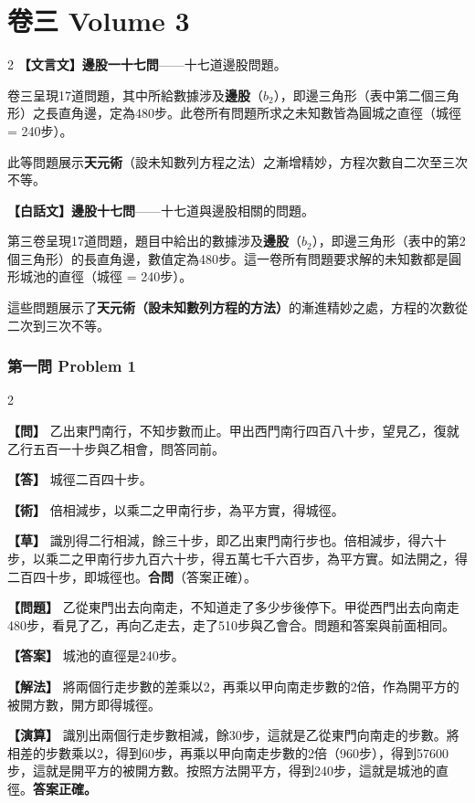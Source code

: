\documentclass[11pt,a4paper]{article}
\newcommand{\wen}[1]{\par\noindent\textbf{\color{problemcolor}【問】} #1\par}
\newcommand{\da}[1]{\par\noindent\textbf{\color{problemcolor}【答】} #1\par}
\newcommand{\shu}[1]{\par\noindent\textbf{\color{problemcolor}【術】} #1\par}
\newcommand{\cao}[1]{\par\noindent\textbf{\color{problemcolor}【草】} #1\par}
\newcommand{\wenm}[1]{\par\noindent\textbf{\color{problemcolor}【問題】} #1\par}
\newcommand{\dam}[1]{\par\noindent\textbf{\color{problemcolor}【答案】} #1\par}
\newcommand{\shum}[1]{\par\noindent\textbf{\color{problemcolor}【解法】} #1\par}
\newcommand{\caom}[1]{\par\noindent\textbf{\color{problemcolor}【演算】} #1\par}
\begin{document}
\newpage

\section{卷三 \quad Volume 3}
\label{sec:vol3}

\begin{paracol}{2}
\textbf{【文言文】}\textbf{邊股一十七問}——十七道邊股問題。

卷三呈現17道問題，其中所給數據涉及\textbf{邊股}（$b_2$），即邊三角形（表中第二個三角形）之長直角邊，定為480步。此卷所有問題所求之未知數皆為圓城之直徑（城徑 = 240步）。

此等問題展示\textbf{天元術}（設未知數列方程之法）之漸增精妙，方程次數自二次至三次不等。

\switchcolumn
\textbf{【白話文】}\textbf{邊股十七問}——十七道與邊股相關的問題。

第三卷呈現17道問題，題目中給出的數據涉及\textbf{邊股}（$b_2$），即邊三角形（表中的第2個三角形）的長直角邊，數值定為480步。這一卷所有問題要求解的未知數都是圓形城池的直徑（城徑 = 240步）。

這些問題展示了\textbf{天元術（設未知數列方程的方法）}的漸進精妙之處，方程的次數從二次到三次不等。
\end{paracol}

\vspace{0.5cm}

\subsubsection*{第一問 \quad Problem 1}

\begin{paracol}{2}
\wen{乙出東門南行，不知步數而止。甲出西門南行四百八十步，望見乙，復就乙行五百一十步與乙相會，問答同前。}

\da{城徑二百四十步。}

\shu{倍相減步，以乘二之甲南行步，為平方實，得城徑。}

\cao{識別得二行相減，餘三十步，即乙出東門南行步也。倍相減步，得六十步，以乘二之甲南行步九百六十步，得五萬七千六百步，為平方實。如法開之，得二百四十步，即城徑也。\textbf{合問}（答案正確）。}

\switchcolumn
\wenm{乙從東門出去向南走，不知道走了多少步後停下。甲從西門出去向南走480步，看見了乙，再向乙走去，走了510步與乙會合。問題和答案與前面相同。}

\dam{城池的直徑是240步。}

\shum{將兩個行走步數的差乘以2，再乘以甲向南走步數的2倍，作為開平方的被開方數，開方即得城徑。}

\caom{識別出兩個行走步數相減，餘30步，這就是乙從東門向南走的步數。將相差的步數乘以2，得到60步，再乘以甲向南走步數的2倍（960步），得到57600步，這就是開平方的被開方數。按照方法開平方，得到240步，這就是城池的直徑。\textbf{答案正確。}}
\end{paracol}
\end{document}
